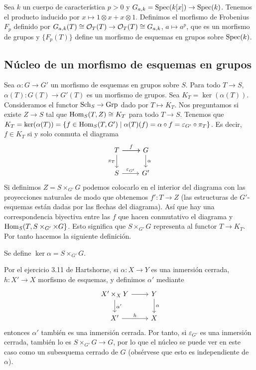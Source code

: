 \documentclass[GA.tex]{subfiles}
\begin{document}
\begin{ej}
Sea $k$ un cuerpo de característica $p>0$ y $G_{a,k}=\operatorname{Spec}(k[x])\to\operatorname{Spec}(k)$. Tenemos el producto inducido por $x\mapsto 1\otimes x+x\otimes 1$. Definimos el morfismo de Frobenius $F_p$ definido por $G_{a,k}(T)\cong{\mathcal O}_T(T)\to {\mathcal O}_T(T)\cong G_{a,k}$, $a\mapsto a^p$, que es un morfismo de grupos y $\{F_p(T)\}$ define un morfismo de esquemas en grupos sobre $\operatorname{Spec}(k)$.  
\end{ej}

\subsection{Núcleo de un morfismo de esquemas en grupos}
Sea $\alpha:G\to G'$ un morfismo de esquemas en grupos sobre $S$. Para todo $T\to S$, $\alpha(T):G(T)\to G'(T)$ es un morfismo de grupos. Sea $K_T=\ker(\alpha(T))$. Consideramos el functor $\operatorname{Sch}_S\to\operatorname{Grp}$ dado por $T\mapsto K_T$. Nos preguntamos si existe $Z\to S$ tal que $\operatorname{Hom}_S(T,Z)\cong K_T$ para todo $T\to S$. Tenemos que $K_T=\ker(\alpha(T))=\{f\in\operatorname{Hom}_S(T,G')\mid \alpha(T)(f)=\alpha\circ f=\varepsilon_{G'}\circ\pi_T\}$. Es decir, $f\in K_T$ si y solo conmuta el diagrama
\[
\begin{tikzcd}
T \arrow[r] \arrow[d, "\pi_T"'] \arrow[r, "f"] & G \arrow[d, "\alpha"] \\
S \arrow[r, "\varepsilon_{G'}"] & G'
\end{tikzcd}
\]
Si definimos $Z=S\times_{G'}G$ podemos colocarlo en el interior del diagrama con las proyecciones naturales de modo que obtenemos $f':T\to Z$ (las estructuras de $G'$-esquemas están dadas por las flechas del diagrama). Así que hay una correspondencia biyectiva entre las $f$ que hacen conmutativo el diagrama y $\operatorname{Hom}_S(T,S\times_{G'}\times G\}$. Esto significa que $S\times_{G'}G$ representa al functor $T\to K_T$. Por tanto hacemos la siguiente definición.

\begin{defi}
Se define $\ker\alpha=S\times_{G'}G$. 
\end{defi}
\begin{nota}
Por el ejercicio 3.11 de Hartshorne, si $\alpha:X\to Y$ es una inmersión cerrada, $h:X'\to X$ morfismo de esquemas, y definimos $\alpha'$ mediante 
\[
\begin{tikzcd}
X'\times_X Y\arrow[r] \arrow[d, "\alpha'"] & Y\arrow[d, "\alpha"]\\
X'\arrow[r, "h"] & X
\end{tikzcd}
\]
entonces $\alpha'$ también es una inmersión cerrada. Por tanto, si $\varepsilon_{G'}$ es una inmersión cerrada, también lo es $S\times_{G'}G\to G$, por lo que el núcleo se puede ver en este caso como un subesquema cerrado de $G$ (obsérvese que esto es independiente de $\alpha$). 
\end{nota}
\end{document}
